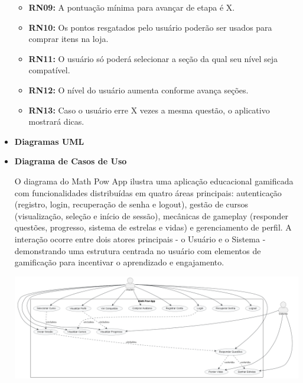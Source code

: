 \begin{itemize}
\begin{itemize}
        \item \textbf{RN09:} A pontuação mínima para avançar de etapa é X.

        \item \textbf{RN10:} Os pontos resgatados pelo usuário poderão ser usados para comprar itens na loja.

        \item \textbf{RN11:} O usuário só poderá selecionar a seção da qual seu nível seja compatível.

        \item \textbf{RN12:} O nível do usuário aumenta conforme avança seções.

        \item \textbf{RN13:} Caso o usuário erre X vezes a mesma questão, o aplicativo mostrará dicas.
        
    
    \end{itemize}

    \item \textbf{Diagramas UML}

       \item \textbf{Diagrama de Casos de Uso}
       
O diagrama do Math Pow App ilustra uma aplicação educacional gamificada com funcionalidades distribuídas em quatro áreas principais: autenticação (registro, login, recuperação de senha e logout), gestão de cursos (visualização, seleção e início de sessão), mecânicas de gameplay (responder questões, progresso, sistema de estrelas e vidas) e gerenciamento de perfil. A interação ocorre entre dois atores principais - o Usuário e o Sistema - demonstrando uma estrutura centrada no usuário com elementos de gamificação para incentivar o aprendizado e engajamento.

       
        \begin{center}
    \includegraphics[width=\linewidth]{figuras/DiagramsUMLs/Math Pow Use Case.png}
\end{center}


\end{itemize}

